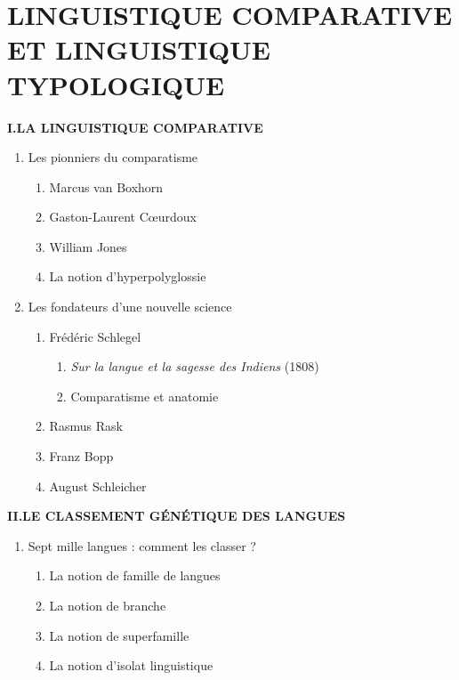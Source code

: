 \newfontfamily{}
\chapter{LINGUISTIQUE COMPARATIVE ET LINGUISTIQUE TYPOLOGIQUE}
\label{chapter-5}
\begin{keybox}
\small
\textbf{I.\quad LA LINGUISTIQUE COMPARATIVE}
\begin{enumerate}[label=\arabic*.]
\item Les pionniers du comparatisme
\begin{enumerate}[label=\textcircled{\scriptsize\arabic*}]
\item Marcus van Boxhorn
\item Gaston-Laurent Cœurdoux
\item William Jones
\item La notion d’hyperpolyglossie
\end{enumerate}
\item Les fondateurs d’une nouvelle science
\begin{enumerate}[label=\textcircled{\scriptsize\arabic*}]
\item Frédéric Schlegel
\begin{enumerate}[label=\arabic*.]
\item \textit{Sur la langue et la sagesse des Indiens} (1808)
\item Comparatisme et anatomie
\end{enumerate}
\item Rasmus Rask
\item Franz Bopp
\item August Schleicher
\end{enumerate}
\end{enumerate}
\textbf{II.\quad LE CLASSEMENT GÉNÉTIQUE DES LANGUES}
\begin{enumerate}[label=\arabic*.]
\item Sept mille langues : comment les classer ?
\begin{enumerate}[label=\textcircled{\scriptsize\arabic*}]
\item La notion de famille de langues
\item La notion de branche
\item La notion de superfamille
\item La notion d’isolat linguistique

\end{enumerate}
\end{enumerate}
\end{keybox}
